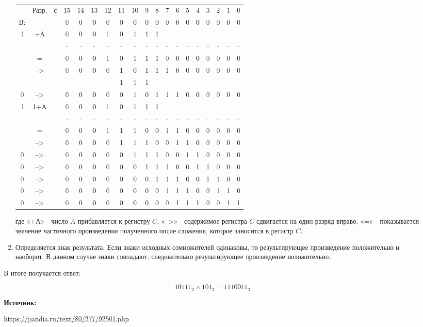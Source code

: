 \documentclass[12pt,a4paper]{scrartcl}
\begin{document}
\begin{enumerate}
	\begin{table}[H]
		\centering
		\begin{tabular}{ccccccccccccccccccc}
			& Разр. & с & 15 & 14 & 13 & 12 & 11 & 10 & 9 & 8 & 7 & 6 & 5 & 4 & 3 & 2 & 1 & 0 \\
			B: &       &   & 0  & 0  & 0  & 0  & 0  & 0  & 0 & 0 & 0 & 0 & 0 & 0 & 0 & 0 & 0 & 0 \\
			1  & +A    &   & 0  & 0  & 0  & 1  & 0  & 1  & 1 & 1 &   &   &   &   &   &   &   &   \\
			&       &   & -  & -  & -  & -  & -  & -  & - & - & - & - & - & - & - & - & - & - \\
			& =     &   & 0  & 0  & 0  & 1  & 0  & 1  & 1 & 1 & 0 & 0 & 0 & 0 & 0 & 0 & 0 & 0 \\
			& -->   &   & 0  & 0  & 0  & 0  & 1  & 0  & 1 & 1 & 1 & 0 & 0 & 0 & 0 & 0 & 0 & 0 \\
			&       &   &    &    &    &    & 1  & 1  & 1 &   &   &   &   &   &   &   &   &   \\
			0  & -->   &   & 0  & 0  & 0  & 0  & 0  & 1  & 0 & 1 & 1 & 1 & 0 & 0 & 0 & 0 & 0 & 0 \\
			1  & 1+A   &   & 0  & 0  & 0  & 1  & 0  & 1  & 1 & 1 &   &   &   &   &   &   &   &   \\
			&       &   & -  & -  & -  & -  & -  & -  & - & - & - & - & - & - & - & - & - & - \\
			& =     &   & 0  & 0  & 0  & 1  & 1  & 1  & 0 & 0 & 1 & 1 & 0 & 0 & 0 & 0 & 0 & 0 \\
			& -->   &   & 0  & 0  & 0  & 0  & 1  & 1  & 1 & 0 & 0 & 1 & 1 & 0 & 0 & 0 & 0 & 0 \\
			0  & -->   &   & 0  & 0  & 0  & 0  & 0  & 1  & 1 & 1 & 0 & 0 & 1 & 1 & 0 & 0 & 0 & 0 \\
			0  & -->   &   & 0  & 0  & 0  & 0  & 0  & 0  & 1 & 1 & 1 & 0 & 0 & 1 & 1 & 0 & 0 & 0 \\
			0  & -->   &   & 0  & 0  & 0  & 0  & 0  & 0  & 0 & 1 & 1 & 1 & 0 & 0 & 1 & 1 & 0 & 0 \\
			0  & -->   &   & 0  & 0  & 0  & 0  & 0  & 0  & 0 & 0 & 1 & 1 & 1 & 0 & 0 & 1 & 1 & 0 \\
			0  & -->   &   & 0  & 0  & 0  & 0  & 0  & 0  & 0 & 0 & 0 & 1 & 1 & 1 & 0 & 0 & 1 & 1
		\end{tabular}
	\end{table}
	
	где «+А» - число $A$ прибавляется к регистру $C$; «-->» - содержимое регистра $C$ сдвигается на один разряд вправо; «=» - показывается значение частичного произведения полученного после сложения, которое заносится в регистр $C$.
	
	\item Определяется знак результата. Если знаки исходных сомножителей одинаковы, то результирующее произведение положительно и наоборот. В данном случае знаки совпадают, следовательно результирующее произведение положительно.
	
\end{enumerate}
В итоге получается ответ:

$$10111_2\times 101_2 = 1110011_2$$

\textbf{Источник:}

\href{https://pandia.ru/text/80/277/92501.php}{https://pandia.ru/text/80/277/92501.php}
	
\end{document}
